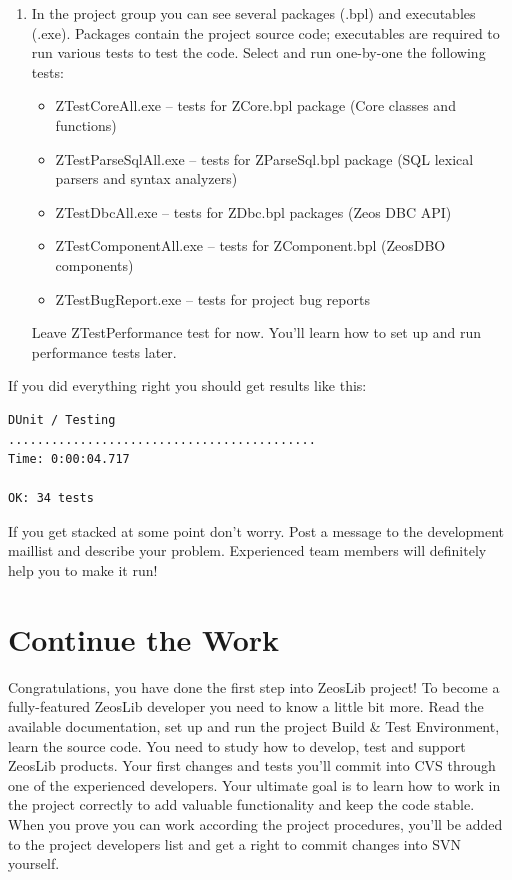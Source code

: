 \documentclass[a4paper,12pt,oneside]{book}
\begin{document}
\begin{enumerate}
  \item
	  In the project group you can see several packages (.bpl) and executables (.exe).
		Packages contain the project source code; executables are required to run various tests to test the code.
		Select and run one-by-one the following tests:
		\begin{itemize}
		  \item ZTestCoreAll.exe – tests for ZCore.bpl package (Core classes and functions)
		  \item ZTestParseSqlAll.exe – tests for ZParseSql.bpl package (SQL lexical parsers and syntax analyzers)
		  \item ZTestDbcAll.exe – tests for ZDbc.bpl packages (Zeos DBC API)
		  \item ZTestComponentAll.exe – tests for ZComponent.bpl (ZeosDBO components)
		  \item ZTestBugReport.exe – tests for project bug reports
		\end{itemize}
		Leave ZTestPerformance test for now.
		You’ll learn how to set up and run performance tests later.
\end{enumerate}

If you did everything right you should get results like this:
\begin{verbatim}
DUnit / Testing
...........................................
Time: 0:00:04.717

OK: 34 tests
\end{verbatim}

If you get stacked at some point don’t worry.
Post a message to the development maillist and describe your problem.
Experienced team members will definitely help you to make it run!

\section{Continue the Work}
Congratulations, you have done the first step into ZeosLib project!
To become a fully-featured ZeosLib developer you need to know a little bit more.
Read the available documentation, set up and run the project Build \& Test Environment, learn the source code.
You need to study how to develop, test and support ZeosLib products.
Your first changes and tests you’ll commit into CVS through one of the experienced developers.
Your ultimate goal is to learn how to work in the project correctly to add valuable functionality and keep the code stable.
When you prove you can work according the project procedures, you’ll be added to the project developers list and get a right to commit changes into SVN yourself.
\end{document}
